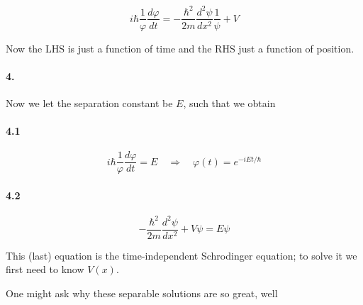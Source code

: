 \documentclass[a4paper]{article}
\begin{document}
\begin{equation}
i\hbar\frac{1}{\varphi}\frac{d\varphi}{dt}=-\frac{\hbar^2}{2m}\frac{d^2\psi}{dx^2}\frac{1}{\psi}+V
\end{equation}

Now the LHS is just a function of time and the RHS just a function of position.

\paragraph{4.} Now we let the separation constant be $E$, such that we obtain

\setlength{\leftskip}{0.5cm}

\paragraph{4.1}

\begin{equation}
	i\hbar\frac{1}{\varphi}\frac{d\varphi}{dt}=E\quad\Rightarrow\quad\varphi(t)=e^{-iEt/\hbar}
\end{equation}

\paragraph{4.2}

\begin{equation}
	-\frac{\hbar^2}{2m}\frac{d^2\psi}{dx^2}+V\psi=E\psi
\end{equation}

\setlength{\leftskip}{0cm}

This (last) equation is the time-independent Schrodinger equation; to solve it we first need to know $V(x)$.

\bigskip

One might ask why these separable solutions are so great, well
\end{document}
